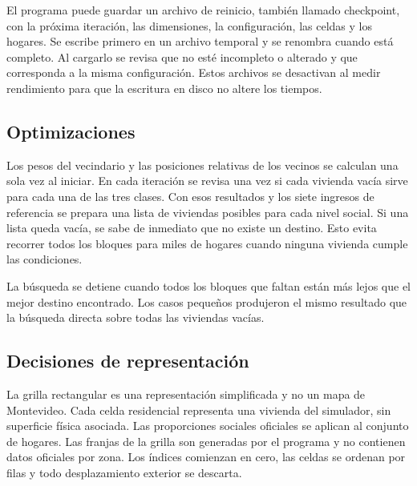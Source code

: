El programa puede guardar un archivo de reinicio, también llamado checkpoint, con la próxima iteración, las dimensiones, la configuración, las celdas y los hogares. Se escribe primero en un archivo temporal y se renombra cuando está completo. Al cargarlo se revisa que no esté incompleto o alterado y que corresponda a la misma configuración. Estos archivos se desactivan al medir rendimiento para que la escritura en disco no altere los tiempos.

\subsection{Optimizaciones}

Los pesos del vecindario y las posiciones relativas de los vecinos se calculan una sola vez al iniciar. En cada iteración se revisa una vez si cada vivienda vacía sirve para cada una de las tres clases. Con esos resultados y los siete ingresos de referencia se prepara una lista de viviendas posibles para cada nivel social. Si una lista queda vacía, se sabe de inmediato que no existe un destino. Esto evita recorrer todos los bloques para miles de hogares cuando ninguna vivienda cumple las condiciones.

La búsqueda se detiene cuando todos los bloques que faltan están más lejos que el mejor destino encontrado. Los casos pequeños produjeron el mismo resultado que la búsqueda directa sobre todas las viviendas vacías.

\subsection{Decisiones de representación}

La grilla rectangular es una representación simplificada y no un mapa de Montevideo. Cada celda residencial representa una vivienda del simulador, sin superficie física asociada. Las proporciones sociales oficiales se aplican al conjunto de hogares. Las franjas de la grilla son generadas por el programa y no contienen datos oficiales por zona. Los índices comienzan en cero, las celdas se ordenan por filas y todo desplazamiento exterior se descarta.
